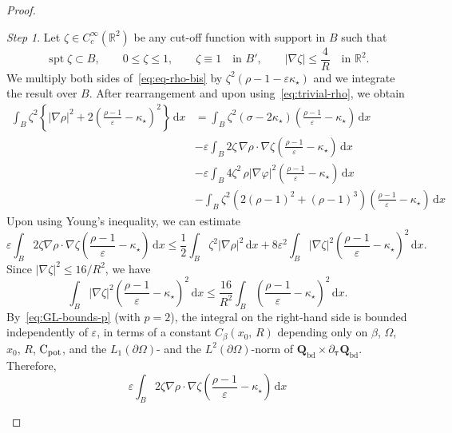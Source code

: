 \documentclass[a4paper, 11pt, twoside, leqno]{article}
\theoremstyle{definition}              %
\theoremstyle{remark}                  %
\newtheorem{step}{Step}
\DeclareMathOperator{\spt}{spt}                                     %
\newcommand{\abs}[1]{\left| #1 \right|}                             %
\renewcommand{\d}{\mathrm{d}}
\newcommand{\R}{\mathbb{R}}
\newcommand{\Q}{\mathbf{Q}}
\newcommand{\eps}{\varepsilon}
\newcommand{\ttau}{{\boldsymbol{\tau}}}
\newcommand{\Qb}{\Q_{\mathrm{bd}}}
\begin{document}
\begin{proof}
\begin{step}
	Let $\zeta \in C^\infty_c(\R^2)$ be any cut-off function with support in $B$ 
    such that 
    \[
    	\spt \zeta \subset B, \qquad 
    	0 \leq \zeta \leq 1, \qquad 
    	\zeta \equiv 1 \quad \mbox{in } B', \qquad 
    	\abs{\nabla \zeta} \leq \frac{4}{R} \quad \mbox{in } \R^2.
    \] 
	We multiply both sides of~\eqref{eq:eq-rho-bis} by 
	$\zeta^2 (\rho - 1 - \eps \kappa_\star)$ and we integrate 
	the result over $B$. After rearrangement and upon 
	using~\eqref{eq:trivial-rho}, we obtain
	\begin{equation}\label{eq:improved-decay-rho-compu1}
	\begin{split}
		\int_B \zeta^2 \left\{ \abs{\nabla \rho}^2 + 2 \left(\frac{\rho-1}{\eps} - \kappa_\star\right)^2 \right\} \,{\d}x 
		&= \int_B \zeta^2 (\sigma - 2 \kappa_\star) \left(\frac{\rho-1}{\eps} - \kappa_\star\right)\,{\d}x \\
		&- \eps \int_B 2 \zeta \, \nabla \rho \cdot \nabla \zeta  \left(\frac{\rho-1}{\eps} - \kappa_\star\right) \,{\d}x \\
		&- \eps \int_B 4 \zeta^2 \, \rho \abs{\nabla \varphi}^2 \left(\frac{\rho-1}{\eps} - \kappa_\star\right)  \,{\d}x \\
		&- \int_B \zeta^2\left( 2 (\rho-1)^2 + (\rho-1)^3 \right)\left(\frac{\rho-1}{\eps} - \kappa_\star\right) \,{\d}x
	\end{split}
	\end{equation}
	Upon using Young's inequality, we can estimate
	\begin{equation}\label{eq:improved-decay-rho-compu2}
		\eps \int_B 2 \zeta \nabla \rho \cdot \nabla \zeta  \left(\frac{\rho-1}{\eps} - \kappa_\star\right) \,{\d}x 
		\leq \frac{1}{2} \int_B \zeta^2 \abs{\nabla \rho}^2\,{\d}x + 8 \eps^2 \int_B \abs{\nabla \zeta}^2 \left(\frac{\rho-1}{\eps} - \kappa_\star\right)^2 \,{\d}x. 
	\end{equation}
	Since $\abs{\nabla \zeta}^2 \leq 16/R^2$, we have  
	\[
		\int_B \abs{\nabla \zeta}^2 \left(\frac{\rho-1}{\eps} - \kappa_\star\right)^2 \,{\d}x 
		\leq \frac{16}{R^2} \int_B \left(\frac{\rho-1}{\eps} - \kappa_\star\right)^2 \,{\d}x.
	\]
	By~\eqref{eq:GL-bounds-p} (with $p = 2$), 
	the integral on the right-hand side 
	is bounded independently of $\eps$, in terms of a constant $C_\beta(x_0,\,R)$ 
	depending only on $\beta$, $\Omega$, $x_0$, $R$, ${\rm C}_{\rm pot}$, and the 
	$L_1(\partial\Omega)$- and the $L^2(\partial\Omega)$-norm
of $\Qb \times \partial_{\ttau}\Qb$. Therefore,
	\[
	\eps \int_B 2 \zeta \nabla \rho \cdot \nabla \zeta  \left(\frac{\rho-1}{\eps} - \kappa_\star\right) \,{\d}x 
\]
\end{step}
\end{proof}
\end{document}
